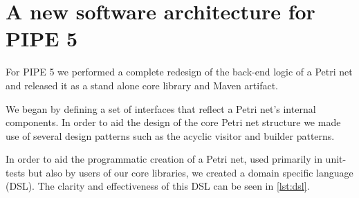 \section{A new software architecture for PIPE 5}
For PIPE 5 we performed a complete redesign of the back-end logic of a Petri net and released it as a stand alone core library and Maven artifact. 

We began by defining a set of interfaces that reflect a Petri net's internal components. In order to aid the design of the core Petri net structure we made use of several design patterns such as the acyclic visitor and builder patterns.
% 

In order to aid the programmatic creation of a Petri net, used primarily in unit-tests but also by users of our core libraries, we created a domain specific language (DSL). The clarity and effectiveness of this DSL can be seen in \cref{lst:dsl}.

